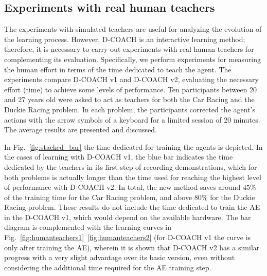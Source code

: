 \subsection{Experiments with real human teachers}

The experiments with simulated teachers are useful for analyzing the evolution of the learning process. However, D\nobreakdash-COACH is an interactive learning method; therefore, it is necessary to carry out experiments with real human teachers for complementing its evaluation. Specifically, we perform experiments for measuring the human effort in terms of the time dedicated to teach the agent. The experiments compare D-COACH v1 and D-COACH v2, evaluating the necessary effort (time) to achieve some levels of performance. Ten participants between 20 and 27 years old were asked to act as teachers for both the Car Racing and the Duckie Racing problem. In each problem, the participants corrected the agent's actions with the arrow symbols of a keyboard for a limited session of 20 minutes. 
The average results are presented and discussed.

In Fig.~\ref{fig:stacked_bar} the time dedicated for training the agents is depicted. In the cases of learning with D-COACH v1, the blue bar indicates the time dedicated by the teachers in its first step of recording demonstrations, which for both problems is actually longer than the time used for reaching the highest level of performance with D-COACH v2. In total, the new method saves around $45\%$ of the training time for the Car Racing problem, and above $80\%$ for the Duckie Racing problem. These results do not include the time dedicated to train the AE in the D-COACH v1, which would depend on the available hardware. The bar diagram is complemented with the learning curves in Fig.~\ref{fig:humanteachers1}~\ref{fig:humanteachers2} (for D-COACH v1 the curve is only after training the AE), wherein it is shown that D-COACH v2 has a similar progress with a very slight advantage over its basic version, even without considering the additional time required for the AE training step.

